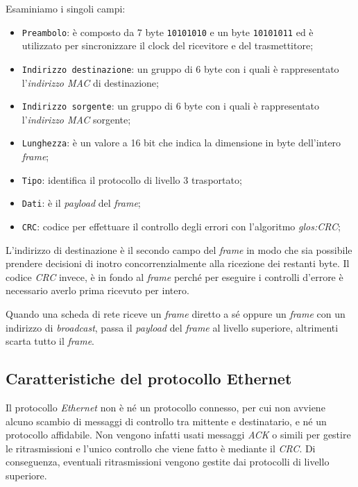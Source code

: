 \bigskip\noindent
Esaminiamo i singoli campi:
\begin{itemize}
    \item \texttt{Preambolo}: è composto da 7 byte \texttt{10101010} e un byte
    \texttt{10101011} ed è utilizzato per sincronizzare il clock del ricevitore
    e del trasmettitore;
    \item \texttt{Indirizzo destinazione}: un gruppo di 6 byte con i quali è
    rappresentato l'\emph{indirizzo MAC} di destinazione;
    \item \texttt{Indirizzo sorgente}: un gruppo di 6 byte con i quali è
    rappresentato l'\emph{indirizzo MAC} sorgente;
    \item \texttt{Lunghezza}: è un valore a 16 bit che indica la dimensione
    in byte dell'intero \emph{frame};
    \item \texttt{Tipo}: identifica il protocollo di livello 3 trasportato;
    \item \texttt{Dati}: è il \emph{payload} del \emph{frame};
    \item \texttt{CRC}: codice per effettuare il controllo degli errori con
    l'algoritmo \emph{\gls{glos:CRC}};
\end{itemize}
\begin{note}
    L'indirizzo di destinazione è il secondo campo del \emph{frame} in modo
    che sia possibile prendere decisioni di inotro concorrenzialmente alla
    ricezione dei restanti byte. Il codice \emph{CRC} invece,
    è in fondo al \emph{frame} perché per eseguire i controlli d'errore è
    necessario averlo prima ricevuto per intero.
\end{note}
\noindent
Quando una scheda di rete riceve un \emph{frame} diretto a sé oppure un
\emph{frame} con un indirizzo di \emph{broadcast}, passa il \emph{payload} del
\emph{frame} al livello superiore, altrimenti scarta tutto il \emph{frame}.

\subsection{Caratteristiche del protocollo Ethernet}
Il protocollo \emph{Ethernet} non è né un protocollo connesso, per cui non avviene
alcuno scambio di messaggi di controllo tra mittente e destinatario, e né un
protocollo affidabile. Non vengono infatti usati messaggi \emph{ACK}
o simili per gestire le ritrasmissioni e l'unico controllo che viene fatto è
mediante il \emph{CRC}. Di conseguenza, eventuali ritrasmissioni vengono gestite
dai protocolli di livello superiore.

